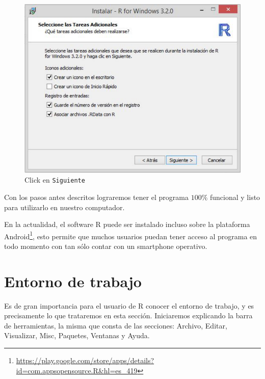 \documentclass[11pt,a4paper,oneside]{book}\usepackage[]{graphicx}\usepackage[]{color}
\begin{document}
\begin{enumerate}
\begin{figure}[H]
    \includegraphics[scale=0.54]{figuras/r11.pdf}
    \caption{Click en \texttt{Siguiente}}
  \end{figure}
\end{enumerate}

Con los pasos antes descritos lograremos tener el programa $100\%$ funcional y listo para utilizarlo en nuestro computador.\newline

En la actualidad, el software R puede ser instalado incluso sobre la plataforma Android\footnote{\url{https://play.google.com/store/apps/details?id=com.appsopensource.R&hl=es_419}}, esto permite que muchos usuarios puedan tener acceso al programa en todo momento con tan sólo contar con un smartphone operativo.

\section{Entorno de trabajo}

Es de gran importancia para el usuario de R conocer el entorno de trabajo, y es precisamente lo que trataremos en esta sección. Iniciaremos explicando  la barra de herramientas, la misma que consta de las secciones: Archivo, Editar, Visualizar, Misc, Paquetes, Ventanas y Ayuda.
\end{document}
